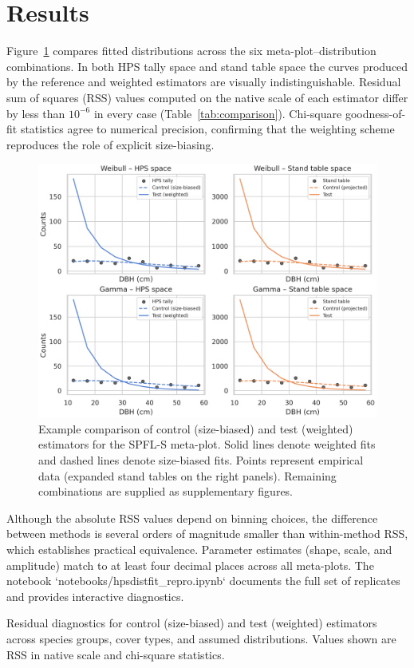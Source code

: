 \section{Results}

Figure~\ref{fig:comparison} compares fitted distributions across the six
meta-plot--distribution combinations. In both HPS tally space and stand table
space the curves produced by the reference and weighted estimators are visually
indistinguishable. Residual sum of squares (RSS) values computed on the native
scale of each estimator differ by less than $10^{-6}$ in every case (Table~\ref{tab:comparison}).
Chi-square goodness-of-fit statistics agree to numerical precision, confirming
that the weighting scheme reproduces the role of explicit size-biasing.

\begin{figure}[htbp]
  \centering
  \includegraphics[width=\textwidth]{../figures/sepm_r_comparison.png}
  \caption{Example comparison of control (size-biased) and test (weighted)
  estimators for the SPFL-S meta-plot. Solid lines denote weighted fits and
  dashed lines denote size-biased fits. Points represent empirical data
  (expanded stand tables on the right panels). Remaining combinations are
  supplied as supplementary figures.}
  \label{fig:comparison}
\end{figure}

Although the absolute RSS values depend on binning choices, the difference
between methods is several orders of magnitude smaller than within-method RSS,
which establishes practical equivalence. Parameter estimates (shape, scale,
and amplitude) match to at least four decimal places across all meta-plots.
The notebook `notebooks/hpsdistfit\_repro.ipynb` documents the full set of
replicates and provides interactive diagnostics.

\begin{table}[htbp]
  \centering
  \resizebox{\textwidth}{!}{%
    
  }
  \caption{Residual diagnostics for control (size-biased) and test (weighted)
  estimators across species groups, cover types, and assumed distributions.
  Values shown are RSS in native scale and chi-square statistics.}
  \label{tab:comparison}
\end{table}
